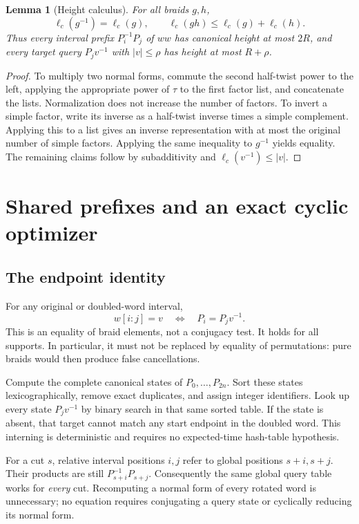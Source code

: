 \documentclass[11pt,a4paper]{article}
\newtheorem{lemma}[theorem]{Lemma}
\theoremstyle{definition}\newtheorem{definition}[theorem]{Definition}
\theoremstyle{remark}\newtheorem{remark}[theorem]{Remark}
\begin{document}
\begin{lemma}[Height calculus]\label{lem:height}
For all braids $g,h$,
\[
 \ell_c(g^{-1})=\ell_c(g),\qquad
 \ell_c(gh)\le\ell_c(g)+\ell_c(h).
\]
Thus every interval prefix $P_i^{-1}P_j$ of $ww$ has canonical height at most
$2R$, and every target query $P_jv^{-1}$ with $|v|\le\rho$ has height at most
$R+\rho$.
\end{lemma}
\begin{proof}
To multiply two normal forms, commute the second half-twist power to the
left, applying the appropriate power of $\tau$ to the first factor list,
and concatenate the lists. Normalization does not increase the number of
factors. To invert a simple factor, write its inverse as a half-twist inverse
times a simple complement. Applying this to a list gives an inverse
representation with at most the original number of simple factors.
Applying the same inequality to $g^{-1}$ yields equality. The remaining
claims follow by subadditivity and $\ell_c(v^{-1})\le |v|$.
\end{proof}

\section{Shared prefixes and an exact cyclic optimizer}

\subsection{The endpoint identity}
For any original or doubled-word interval,
\begin{equation}\label{eq:endpoint}
 w[i:j]=v\quad\Longleftrightarrow\quad P_i=P_jv^{-1}.
\end{equation}
This is an equality of braid elements, not a conjugacy test. It holds for
all supports. In particular, it must not be replaced by equality of
permutations: pure braids would then produce false cancellations.

Compute the complete canonical states of $P_0,\ldots,P_{2n}$. Sort these
states lexicographically, remove exact duplicates, and assign integer
identifiers. Look up every state $P_jv^{-1}$ by binary search in that same
sorted table. If the state is absent, that target cannot match any start
endpoint in the doubled word. This interning is deterministic and requires
no expected-time hash-table hypothesis.

For a cut $s$, relative interval positions $i,j$ refer to global positions
$s+i,s+j$. Their products are still $P_{s+i}^{-1}P_{s+j}$. Consequently the
same global query table works for \emph{every} cut. Recomputing a normal form
of every rotated word is unnecessary; no equation requires conjugating a
query state or cyclically reducing its normal form.
\end{document}
